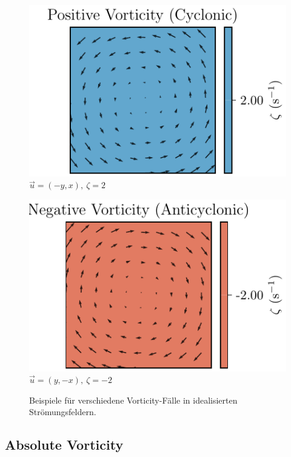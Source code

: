 \begin{figure}
	\begin{minipage}{0.32\linewidth}
		\centering
		\includegraphics[width=\linewidth]{papers/rossby/images/vorticity_plot3.pdf}\\
		{\small \( \vec{u} = (-y,x),\ \zeta = 2\)}
	\end{minipage}
	\begin{minipage}{0.32\linewidth}
		\centering
		\includegraphics[width=\linewidth]{papers/rossby/images/vorticity_plot4.pdf}\\
		{\small \( \vec{u} = (y,-x),\ \zeta = -2\)}
	\end{minipage}

	\caption{Beispiele für verschiedene Vorticity-Fälle in idealisierten Strömungsfeldern.}
	\label{fig:vorticity_examples}
\end{figure}

\subsection{Absolute Vorticity}

